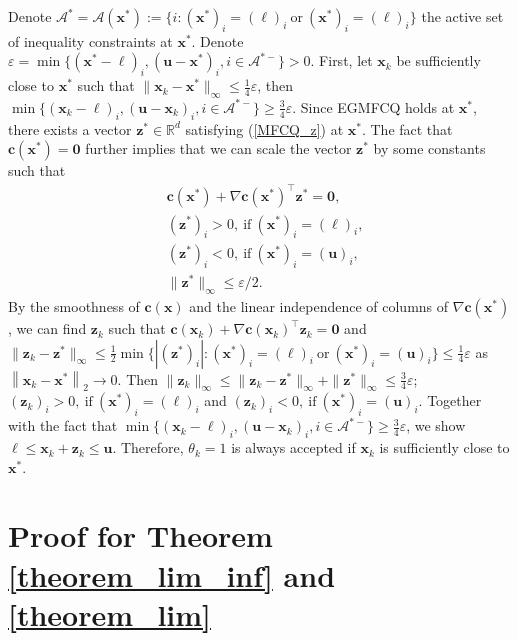 \documentclass[aos]{imsart}
\numberwithin{equation}{section}
\theoremstyle{plain}
\begin{document}
\begin{appendix}
Denote $\mathcal{A}^{*} = \mathcal{A}(\bm{x}^{*}):= \{i: (\bm{x}^{*})_i = (\bm{\ell})_i~\text{or}~(\bm{x}^{*})_i = (\bm{\ell})_i\}$ the active set of inequality constraints at $\bm{x}^{*}$. Denote $\varepsilon = \min \{ (\bm{x}^{*}-\bm{\ell})_i, (\bm{u} - \bm{x}^{*})_i, i \in \mathcal{A}^{*-}\} > 0$. First, let $\bm{x}_k$ be sufficiently close to $\bm{x}^{*}$ such that $\|\bm{x}_k - \bm{x}^{*}\|_{\infty} \leq \frac{1}{4} \varepsilon$, then $\min \{ (\bm{x}_{k}-\bm{\ell})_i, (\bm{u} - \bm{x}_{k})_i, i \in \mathcal{A}^{*-}\} \geq \frac{3}{4}\varepsilon$. Since EGMFCQ holds at $\bm{x}^{*}$, there exists a vector $\bm{z}^{*} \in \mathbb{R}^{d}$ satisfying (\ref{MFCQ_z}) at $\bm{x}^{*}$. The fact that $\bm{c}(\bm{x}^{*}) = \bm{0}$ further implies that we can scale the vector $\bm{z}^{*}$ by some constants such that 
    \begin{equation*}
        \begin{split}
            & \bm{c}(\bm{x}^{*}) + \nabla \bm{c}(\bm{x}^{*})^{\top} \bm{z}^{*} = \bm{0},\\
            & (\bm{z}^{*})_i >0,~\text{if}~(\bm{x}^{*})_{i} = (\bm{\ell})_i,\\
            & (\bm{z}^{*})_i < 0,~\text{if}~(\bm{x}^{*})_{i} = (\bm{u})_i,\\
            & \|\bm{z}^{*}\|_{\infty} \leq \varepsilon/2.
        \end{split}
    \end{equation*}
    By the smoothness of $\bm{c}(\bm{x})$ and the linear independence of columns of $\nabla \bm{c}(\bm{x}^{*})$, we can find $\bm{z}_k$ such that $\bm{c}(\bm{x}_k) + \nabla \bm{c}(\bm{x}_k)^{\top} \bm{z}_k = \bm{0}$ and $\|\bm{z}_k - \bm{z}^{*}\|_{\infty} \leq \frac{1}{2} \min\{|(\bm{z}^{*})_{i}|:(\bm{x}^{*})_{i} = (\bm{\ell})_i ~\text{or}~ (\bm{x}^{*})_{i} = (\bm{u})_i \} \leq \frac{1}{4} \varepsilon$ as $\left\| \bm{x}_k - \bm{x}^{*} \right\|_2 \to 0$. Then $\|\bm{z}_k \|_{\infty} \leq \|\bm{z}_k - \bm{z}^{*}\|_{\infty} + \|\bm{z}^{*}\|_{\infty} \leq \frac{3}{4} \varepsilon$; $(\bm{z}_{k})_i >0,~\text{if}~(\bm{x}^{*})_{i} = (\bm{\ell})_i$ and $(\bm{z}_{k})_i < 0,~\text{if}~(\bm{x}^{*})_{i} = (\bm{u})_i$. Together with the fact that $\min \{ (\bm{x}_{k}-\bm{\ell})_i, (\bm{u} - \bm{x}_{k})_i, i \in \mathcal{A}^{*-}\} \geq \frac{3}{4}\varepsilon$, we show $\bm{\ell} \leq \bm{x}_k + \bm{z}_k  \leq \bm{u}$. Therefore, $\theta_k = 1$ is always accepted if $\bm{x}_k$ is sufficiently close to $\bm{x}^{*}$.


\newpage
\section{Proof for Theorem \ref{theorem_lim_inf} and \ref{theorem_lim}}
\label{sec:appendix2}


\end{appendix}
\end{document}
